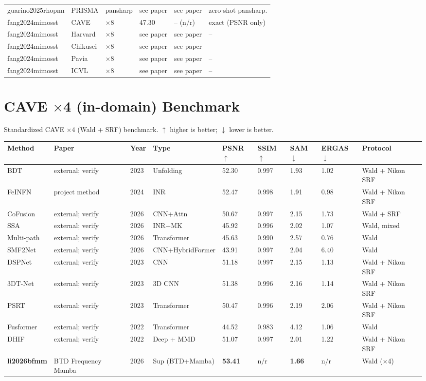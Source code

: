 \documentclass[11pt]{article}
\begin{document}
\begin{longtable}{@{}p{2.6cm}p{2.6cm}p{1.6cm}p{2.0cm}p{1.9cm}p{3.1cm}@{}}
guarino2025rhopnn & PRISMA & pansharp & see paper & see paper & zero-shot pansharp. \\
fang2024mimosst & CAVE & $\times$8 & 47.30 & -- (n/r) & exact (PSNR only) \\
fang2024mimosst & Harvard & $\times$8 & see paper & see paper & -- \\
fang2024mimosst & Chikusei & $\times$8 & see paper & see paper & -- \\
fang2024mimosst & Pavia & $\times$8 & see paper & see paper & -- \\
fang2024mimosst & ICVL & $\times$8 & see paper & see paper & -- \\
\end{longtable}
\normalsize

\section{CAVE $\times$4 (in-domain) Benchmark}
Standardized CAVE $\times$4 (Wald + SRF) benchmark. $\uparrow$ higher is better;
$\downarrow$ lower is better.
\small
\begin{longtable}{@{}p{2.2cm}p{3.0cm}p{1.0cm}p{1.9cm}p{1.5cm}p{1.4cm}p{1.4cm}p{1.4cm}p{2.4cm}@{}}
\toprule
\textbf{Method} & \textbf{Paper} & \textbf{Year} & \textbf{Type} & \textbf{PSNR$\uparrow$} & \textbf{SSIM$\uparrow$} & \textbf{SAM$\downarrow$} & \textbf{ERGAS$\downarrow$} & \textbf{Protocol} \\
\midrule
\endhead
\bottomrule
\endfoot
%
BDT & external; verify & 2023 & Unfolding & 52.30 & 0.997 & 1.93 & 1.02 & Wald + Nikon SRF \\
FeINFN & project method & 2024 & INR & 52.47 & 0.998 & 1.91 & 0.98 & Wald + Nikon SRF \\
CoFusion & external; verify & 2026 & CNN+Attn & 50.67 & 0.997 & 2.15 & 1.73 & Wald + SRF \\
SSA & external; verify & 2026 & INR+MK & 45.92 & 0.996 & 2.02 & 1.07 & Wald, mixed \\
Multi-path & external; verify & 2026 & Transformer & 45.63 & 0.990 & 2.57 & 0.76 & Wald \\
SMF2Net & external; verify & 2026 & CNN+HybridFormer & 43.91 & 0.997 & 2.04 & 6.40 & Wald \\
DSPNet & external; verify & 2023 & CNN & 51.18 & 0.997 & 2.15 & 1.13 & Wald + Nikon SRF \\
3DT-Net & external; verify & 2023 & 3D CNN & 51.38 & 0.996 & 2.16 & 1.14 & Wald + Nikon SRF \\
PSRT & external; verify & 2023 & Transformer & 50.47 & 0.996 & 2.19 & 2.06 & Wald + Nikon SRF \\
Fusformer & external; verify & 2022 & Transformer & 44.52 & 0.983 & 4.12 & 1.06 & Wald \\
DHIF & external; verify & 2022 & Deep + MMD & 51.07 & 0.997 & 2.01 & 1.22 & Wald + Nikon SRF \\
\textbf{li2026bfmm} & BTD Frequency Mamba & 2026 & Sup (BTD+Mamba) & \textbf{53.41} & n/r & \textbf{1.66} & n/r & Wald ($\times$4) \\
\end{longtable}
\end{document}
